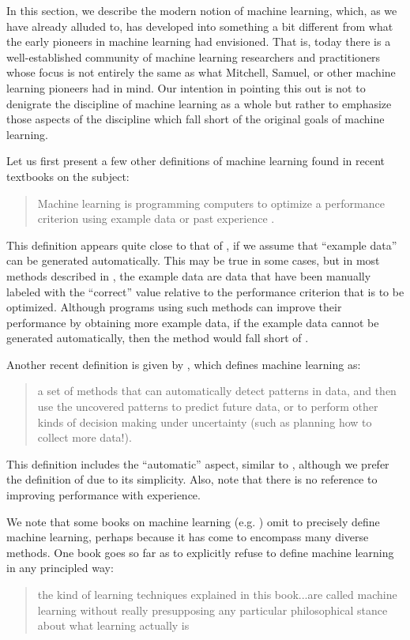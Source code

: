 In this section, we describe the modern notion of machine learning, which, as we have already alluded to, has developed into something a bit different from what the early pioneers in machine learning had envisioned. That is, today there is a well-established community of machine learning researchers and practitioners whose focus is not entirely the same as what Mitchell, Samuel, or other machine learning pioneers had in mind. Our intention in pointing this out is not to denigrate the discipline of machine learning as a whole but rather to emphasize those aspects of the discipline which fall short of the original goals of machine learning. 

Let us first present a few other definitions of machine learning found in recent textbooks on the subject:
%
\begin{quote}
Machine learning is programming computers to optimize a performance criterion using example data or past experience \cite{alpaydin2014introduction}.
\end{quote}
%

This definition appears quite close to that of \cite{Mitchell1990}, if we assume that ``example data'' can be generated automatically. This may be true in some cases, but in most methods described in \cite{alpaydin2014introduction}, the example data are data that have been manually labeled with the ``correct'' value relative to the performance criterion that is to be optimized. Although programs using such methods can improve their performance by obtaining more example data, if the example data cannot be generated automatically, then the method would fall short of \cite{Mitchell1990}.

Another recent definition is given by \cite{Murphy2012}, which defines machine learning as:
%
\begin{quote}
a set of methods that can automatically detect patterns in data, and then use the uncovered patterns to predict future data, or to perform other kinds of decision making under uncertainty (such as planning how to collect more data!).
\end{quote}
%
This definition includes the ``automatic'' aspect, similar to \cite{Mitchell1990}, although we prefer the definition of \cite{Mitchell1990} due to its simplicity. Also, note that there is no reference to improving performance with experience.

We note that some books on machine learning (e.g. \cite{bishop2006pattern}) omit to precisely define machine learning, perhaps because it has come to encompass many diverse methods. One book goes so far as to explicitly refuse to define machine learning in any principled way:
%
\begin{quote}
the kind of learning techniques explained in this book...are called machine learning without really presupposing any particular philosophical stance about what learning actually is \cite{witten2005data}
\end{quote}
%

